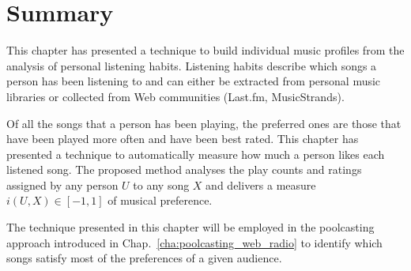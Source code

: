 
\section{Summary} %
\label{sec:contributions5}

This chapter has presented a technique to build individual music profiles from the analysis of personal listening habits.
%
Listening habits describe which songs a person has been listening to and can either be extracted from personal music libraries or collected from Web communities (Last.fm, MusicStrands). %

Of all the songs that a person has been playing, the preferred ones are those that have been played more often and have been best rated.
This chapter has presented a technique to automatically measure how much a person likes each listened song.
%
The proposed method analyses the play counts and ratings assigned by any person $U$ to any song $X$ and delivers a measure $i(U,X) \in [-1,1]$ of musical preference.

The technique presented in this chapter will be employed in the poolcasting approach introduced in Chap.~\ref{cha:poolcasting_web_radio} to identify which songs satisfy most of the preferences of a given audience.



